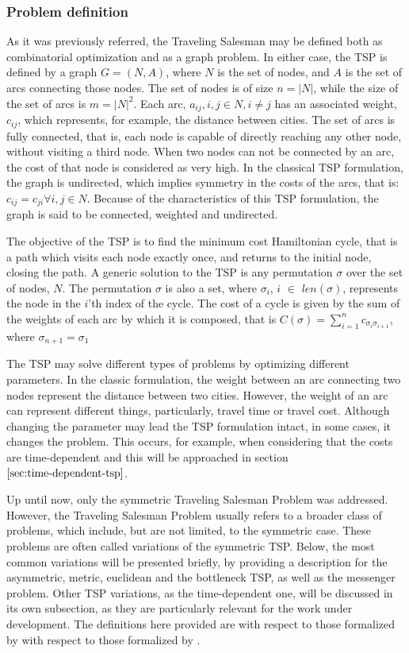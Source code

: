 \subsubsection{Problem definition}
\label{sec:classic_tsp}

As it was previously referred, the Traveling Salesman may be defined both as combinatorial optimization and as a graph problem. In either case, the TSP is defined by a graph $G = (N, A)$, where $N$ is the set of nodes, and $A$ is the set of arcs connecting those nodes. The set of nodes is of size $n = |N|$, while the size of the set of arcs is $m = |N|^2$. Each arc, $a_{ij}, i, j \in N, i \ne j$ has an associated weight, $c_{ij}$, which represents, for example, the distance between cities. The set of arcs is fully connected, that is, each node is capable of directly reaching any other node, without visiting a third node. When two nodes can not be connected by an arc, the cost of that node is considered as very high. In the classical TSP formulation, the graph is undirected, which implies symmetry in the costs of the arcs, that is: $c_{ij} = c_{ji} \forall i, j \in N$. Because of the characteristics of this TSP formulation, the graph is said to be connected, weighted and undirected.

The objective of the TSP is to find the minimum cost Hamiltonian cycle, that is a path which visits each node exactly once, and returns to the initial node, closing the path. A generic solution to the TSP is any permutation $\sigma$ over the set of nodes, $N$. The permutation $\sigma$ is also a set, where $\sigma_{i}$, $i$ $\in$ $len(\sigma)$, represents the node in the $i$'th index of the cycle. The cost of a cycle is given by the sum of the weights of each arc by which it is composed, that is $C(\sigma) = \sum_{i=1}^{n} c_{\sigma_{i} \sigma_{i+1}}$, where $\sigma_{n+1} = \sigma_{1}$

The TSP may solve different types of problems by optimizing different parameters. In the classic formulation, the weight between an arc connecting two nodes represent the distance between two cities. However, the weight of an arc can represent different things, particularly, travel time or travel cost. Although changing the parameter may lead the TSP formulation intact, in some cases, it changes the problem. This occurs, for example, when considering that the costs are time-dependent and this will be approached in section $\ref{sec:time-dependent-tsp}$.

Up until now, only the symmetric Traveling Salesman Problem was addressed. However, the Traveling Salesman Problem usually refers to a broader class of problems, which include, but are not limited, to the symmetric case. These problems are often called variations of the symmetric TSP. Below, the most common variations will be presented briefly, by providing a description for the asymmetric, metric, euclidean and the bottleneck TSP, as well as the messenger problem. %
Other TSP variations, as the time-dependent one, will be discussed in its own subsection, as they are particularly relevant for the work under development. The definitions here provided are with respect to those formalized by with respect to those formalized by \cite{tsp_book}.

